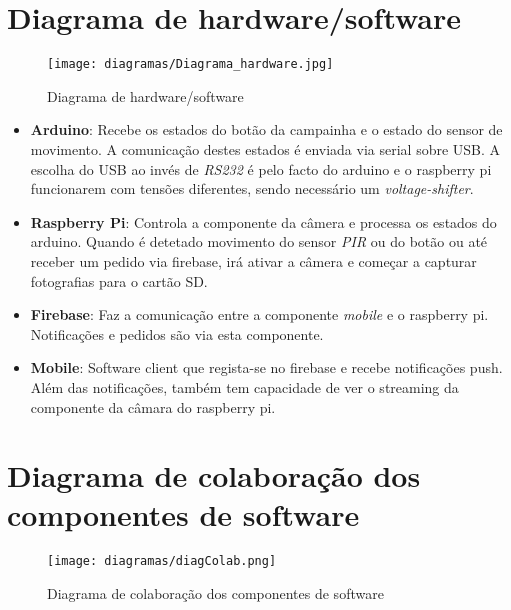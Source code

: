 \documentclass{article}
\begin{document}
\section{Diagrama de hardware/software}

    \begin{figure}[h!]
    \centering
    \texttt{[image: diagramas/Diagrama\_hardware.jpg]}
    \caption{Diagrama de hardware/software}
    \label{fig:diaHardware}
\end{figure}

\begin{itemize}
    \item \textbf{Arduino}: Recebe os estados do botão da campainha e o estado do sensor de movimento. A comunicação destes estados é enviada via serial sobre USB. A escolha do USB ao invés de \textit{RS232} é pelo facto do arduino e o raspberry pi funcionarem com tensões diferentes, sendo necessário um \textit{voltage-shifter}.
    \item \textbf{Raspberry Pi}: Controla a componente da câmera e processa os estados do arduino. Quando é detetado movimento do sensor \textit{PIR} ou do botão ou até receber um pedido via firebase, irá ativar a câmera e começar a capturar fotografias para o cartão SD.
    \item \textbf{Firebase}: Faz a comunicação entre a componente \textit{mobile} e o raspberry pi. Notificações e pedidos são via esta componente.
    \item \textbf{Mobile}: Software client que regista-se no firebase e recebe notificações push. Além das notificações, também tem capacidade de ver o streaming da componente da câmara do raspberry pi.
\end{itemize}

\section{Diagrama de colaboração dos componentes de software}

\begin{figure}[h!]
    \centering
    \texttt{[image: diagramas/diagColab.png]}
    \caption{Diagrama de colaboração dos componentes de software}
    \label{fig:diagGantt}
\end{figure}
\end{document}
